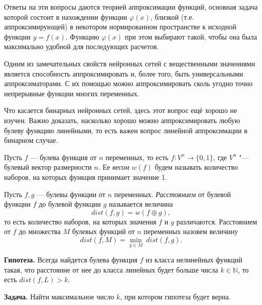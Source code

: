     Ответы на эти вопросы даются теорией аппроксимации функций, основная задача которой состоит в нахождении функции $\varphi(x)$, близкой (т.е. аппроксимирующей) в некотором нормированном пространстве к исходной функции $y = f(x)$. Функцию $\varphi(x)$ при этом выбирают такой, чтобы она была максимально удобной для последующих расчетов.
    
    Одним из замечательных свойств нейронных сетей с вещественными значениями является способность аппроксимировать и, более того, быть универсальными аппроксиматорами. С их помощью можно аппроксимировать сколь угодно точно непрерывные функции многих переменных. \cite{twelfth}
    
    Что касается бинарных нейронных сетей, здесь этот вопрос ещё хорошо не изучен. Важно доказать, насколько хорошо можно аппроксимировать любую булеву функцию линейными, то есть важен вопрос линейной аппроксимации в бинарном случае.
    
    \begin{definition}
    Пусть $f$ — булева функция от $n$ переменных, то есть $f: V^n \rightarrow \{0, 1\}$, где $V^n$ "--- булевый вектор размерности $n$. Ее \emph{весом} $w(f)$ будем называть количество наборов, на которых функция принимает значение 1.
    \end{definition}
    
    \begin{definition}
    Пусть $f, g$ — булевы функции от $n$ переменных. \emph{Расстоянием} от булевой функции $f$ до булевой функции $g$ называется величина $$dist(f, g) = w(f \oplus g),$$ то есть количество наборов, на которых значения $f$ и $g$ различаются. Расстоянием от $f$ до множества $M$ булевых функций от $n$ переменных назовем величину $$dist(f, M) = \min_{g \in M}\ dist(f, g).$$
    \end{definition}
    
    
    \textbf{Гипотеза.}
    Всегда найдется булева функция $f$ из класса нелинейных функций такая, что расстояние от нее до класса линейных будет больше числа $k \in \mathbb {N}$, то есть $dist(f, L) > k$.
    
    \textbf{Задача.}
    Найти максимальное число $k$, при котором гипотеза будет верна.
    
